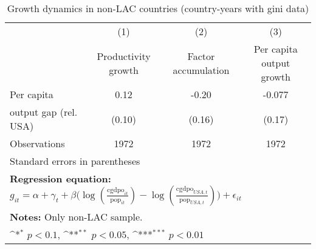 \begin{table}[htbp]\centering
\def\sym#1{\ifmmode^{#1}\else\(^{#1}\)\fi}
\caption{Growth dynamics in non-LAC countries (country-years with gini data)}
\begin{tabular}{l*{3}{c}}
\toprule
                &\multicolumn{1}{c}{(1)}&\multicolumn{1}{c}{(2)}&\multicolumn{1}{c}{(3)}\\
                &\multicolumn{1}{c}{Productivity growth}&\multicolumn{1}{c}{Factor accumulation}&\multicolumn{1}{c}{Per capita output growth}\\
\midrule
Per capita      &     0.12         &    -0.20         &   -0.077         \\
output gap (rel. USA)&   (0.10)         &   (0.16)         &   (0.17)         \\
\midrule
Observations    &     1972         &     1972         &     1972         \\
\bottomrule
\multicolumn{4}{l}{\footnotesize Standard errors in parentheses}\\
\multicolumn{4}{l}{\footnotesize \textbf{Regression equation:} \(g_{it} = \alpha + \gamma_t + \beta \big(\log (\frac{\textrm{cgdpo}_{it}}{\textrm{pop}_{it}} ) - \log (\frac{\textrm{cgdpo}_{USA,t}}{\textrm{pop}_{USA,t}}  ) \big) + \epsilon_{it}\)}\\
\multicolumn{4}{l}{\footnotesize \textbf{Notes:} Only non-LAC sample.}\\
\multicolumn{4}{l}{\footnotesize \sym{*} \(p<0.1\), \sym{**} \(p<0.05\), \sym{***} \(p<0.01\)}\\
\end{tabular}
\end{table}
